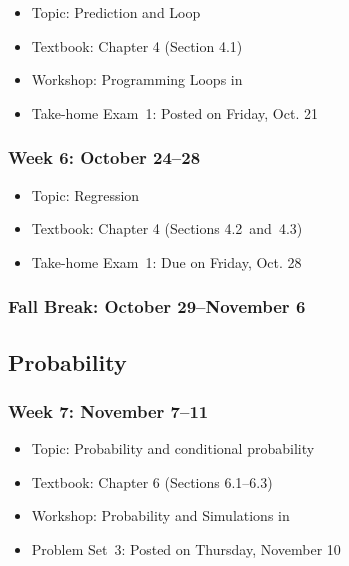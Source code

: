 \documentclass[11pt]{article}
\begin{document}
\begin{itemize}

\item {\sc Topic}: Prediction and Loop

\item {\sc Textbook}: Chapter 4 (Section 4.1)

\item {\sc Workshop}: Programming Loops in \R

\item {\sc Take-home Exam~1}: Posted on Friday, Oct. 21

\end{itemize}


\subsubsection*{\sc Week 6: October 24--28}

\begin{itemize}

\item {\sc Topic}: Regression

\item {\sc Textbook}: Chapter 4 (Sections 4.2~and~4.3) 

\item {\sc Take-home Exam~1}: Due on Friday, Oct. 28

\end{itemize}

\subsubsection*{\sc Fall Break: October 29--November 6}

\medskip

\subsection*{Probability}


\subsubsection*{\sc Week 7: November 7--11}

\begin{itemize}

\item {\sc Topic}: Probability and conditional probability

\item {\sc Textbook}: Chapter 6 (Sections 6.1--6.3)

\item {\sc Workshop}: Probability and Simulations in \R

\item {\sc Problem Set~3}: Posted on Thursday, November 10 

\end{itemize}
\end{document}
